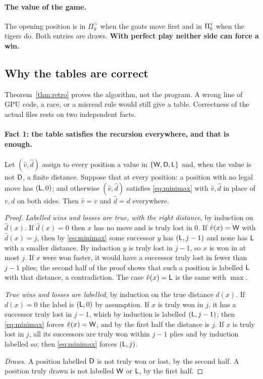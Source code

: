 \paragraph{The value of the game.} The opening position is in $\Pi^{\gt}_0$ when the goats move first and in
$\Pi^{\textsc{t}}_0$ when the tigers do. Both entries are draws. \textbf{With perfect play neither side can force a win.}

\subsection{Why the tables are correct}\label{sec:dp-proof}

Theorem~\ref{thm:retro} proves the algorithm, not the program. A wrong line of GPU code, a race, or a
misread rule would still give a table. Correctness of the actual files rests on two independent facts.

\paragraph{Fact 1: the table satisfies the recursion everywhere, and that is enough.}

\begin{theorem}[Certificate]\label{thm:certificate}
Let $(\hat v, \hat d)$ assign to every position a value in $\{\mathsf{W}, \mathsf{D}, \mathsf{L}\}$ and, when the value is not $\mathsf{D}$, a
finite distance. Suppose that at every position: a position with no legal move has $(\mathsf{L}, 0)$; and otherwise
$(\hat v, \hat d)$ satisfies \eqref{eq:minimax} with $\hat v, \hat d$ in place of $v, d$ on both sides. Then
$\hat v = v$ and $\hat d = d$ everywhere.
\end{theorem}

\begin{proof}
\emph{Labelled wins and losses are true, with the right distance}, by induction on $\hat d(x)$. If
$\hat d(x) = 0$ then $x$ has no move and is truly lost in 0. If $\hat v(x) = \mathsf{W}$ with $\hat d(x) = j$, then by
\eqref{eq:minimax} some successor $y$ has $(\mathsf{L}, j - 1)$ and none has $\mathsf{L}$ with a smaller distance. By
induction $y$ is truly lost in $j - 1$, so $x$ is won in at most $j$. If $x$ were won faster, it would have a
successor truly lost in fewer than $j - 1$ plies; the second half of the proof shows that such a position is
labelled $\mathsf{L}$ with that distance, a contradiction. The case $\hat v(x) = \mathsf{L}$ is the same with $\max$.

\emph{True wins and losses are labelled}, by induction on the true distance $d(x)$. If $d(x) = 0$ the label is
$(\mathsf{L}, 0)$ by assumption. If $x$ is truly won in $j$, it has a successor truly lost in $j - 1$, which by
induction is labelled $(\mathsf{L}, j - 1)$; then \eqref{eq:minimax} forces $\hat v(x) = \mathsf{W}$, and by the first half the
distance is $j$. If $x$ is truly lost in $j$, all its successors are truly won within $j - 1$ plies and by
induction labelled so; then \eqref{eq:minimax} forces $(\mathsf{L}, j)$.

\emph{Draws.} A position labelled $\mathsf{D}$ is not truly won or lost, by the second half. A position truly drawn is
not labelled $\mathsf{W}$ or $\mathsf{L}$, by the first half.
\end{proof}

